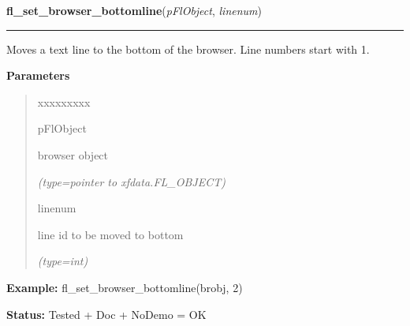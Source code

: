 \hspace{.8\funcindent}\begin{boxedminipage}{\funcwidth}

    \raggedright \textbf{fl\_set\_browser\_bottomline}(\textit{pFlObject}, \textit{linenum})

    \vspace{-1.5ex}

    \rule{\textwidth}{0.5\fboxrule}
\setlength{\parskip}{2ex}
    Moves a text line to the bottom of the browser. Line numbers start with
    1.

\setlength{\parskip}{1ex}
      \textbf{Parameters}
      \vspace{-1ex}

      \begin{quote}
        \begin{Ventry}{xxxxxxxxx}

          \item[pFlObject]

          browser object

            {\it (type=pointer to xfdata.FL\_OBJECT)}

          \item[linenum]

          line id to be moved to bottom

            {\it (type=int)}

        \end{Ventry}

      \end{quote}

\textbf{Example:} fl\_set\_browser\_bottomline(brobj, 2)



\textbf{Status:} Tested + Doc + NoDemo = OK



    \end{boxedminipage}

    \label{xformslib:flbrowser:fl_set_browser_fontsize}

    \vspace{0.5ex}

